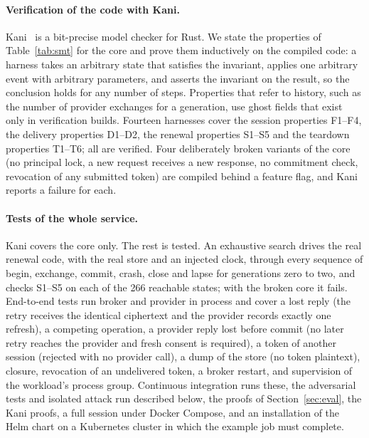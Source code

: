 \documentclass[11pt]{article}
\begin{document}
\paragraph{Verification of the code with Kani.} Kani~\cite{kani} is a bit-precise model checker for Rust. We state the properties of Table~\ref{tab:smt} for the core and prove them inductively on the compiled code: a harness takes an arbitrary state that satisfies the invariant, applies one arbitrary event with arbitrary parameters, and asserts the invariant on the result, so the conclusion holds for any number of steps. Properties that refer to history, such as the number of provider exchanges for a generation, use ghost fields that exist only in verification builds. Fourteen harnesses cover the session properties F1--F4, the delivery properties D1--D2, the renewal properties S1--S5 and the teardown properties T1--T6; all are verified. Four deliberately broken variants of the core (no principal lock, a new request receives a new response, no commitment check, revocation of any submitted token) are compiled behind a feature flag, and Kani reports a failure for each.

\paragraph{Tests of the whole service.} Kani covers the core only. The rest is tested. An exhaustive search drives the real renewal code, with the real store and an injected clock, through every sequence of begin, exchange, commit, crash, close and lapse for generations zero to two, and checks S1--S5 on each of the 266 reachable states; with the broken core it fails. End-to-end tests run broker and provider in process and cover a lost reply (the retry receives the identical ciphertext and the provider records exactly one refresh), a competing operation, a provider reply lost before commit (no later retry reaches the provider and fresh consent is required), a token of another session (rejected with no provider call), a dump of the store (no token plaintext), closure, revocation of an undelivered token, a broker restart, and supervision of the workload's process group. Continuous integration runs these, the adversarial tests and isolated attack run described below, the proofs of Section~\ref{sec:eval}, the Kani proofs, a full session under Docker Compose, and an installation of the Helm chart on a Kubernetes cluster in which the example job must complete.
\end{document}
